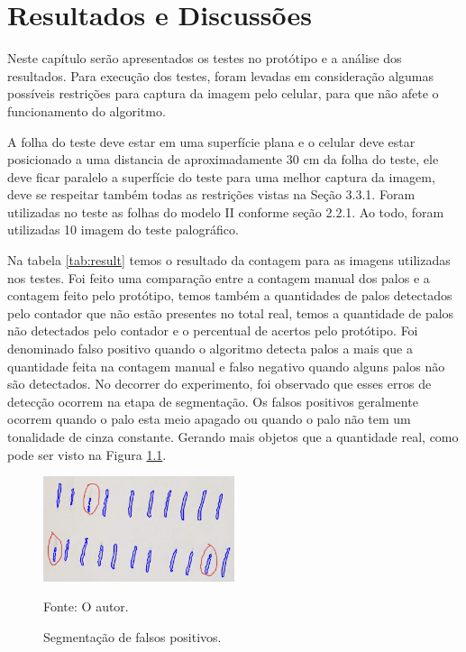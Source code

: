 \chapter{Resultados e Discussões}
\label{cap:resultados}

Neste capítulo serão apresentados os testes no protótipo e a análise dos resultados. Para execução dos testes, foram levadas em consideração algumas possíveis restrições para captura da imagem pelo celular, para que não afete o funcionamento do algoritmo. 

A folha do teste deve estar em uma superfície plana e o celular deve estar posicionado a uma distancia de aproximadamente 30 cm da folha do teste, ele deve ficar paralelo a superfície do teste para uma melhor captura da imagem, deve se respeitar também todas as restrições vistas na Seção 3.3.1. Foram utilizadas no teste as folhas do modelo II conforme seção 2.2.1. Ao todo, foram utilizadas 10 imagem do teste palográfico.

Na tabela \ref{tab:result}  temos o resultado da contagem para as imagens utilizadas nos testes. Foi feito uma comparação entre a contagem manual dos palos e a contagem feito pelo protótipo, temos também a quantidades de palos detectados pelo contador que não estão presentes no total real, temos a quantidade de palos não detectados pelo contador e o percentual de acertos pelo protótipo. Foi denominado falso positivo quando o algoritmo detecta palos a mais que a quantidade feita na contagem manual e falso negativo quando alguns palos não são detectados.
No decorrer do experimento, foi observado que esses erros de detecção ocorrem na etapa de segmentação. Os falsos positivos geralmente ocorrem quando o palo esta meio apagado ou quando o palo não tem um tonalidade de cinza constante. Gerando mais objetos que a quantidade real, como pode ser visto na Figura \ref{fig:palo-seg}.

\begin{figure}[H]
 \centering
 \includegraphics[width=0.50\textwidth]{./fig/resultado-analise/seg-palo}
 \caption{Segmentação de falsos positivos.}
  Fonte: O autor.
 \label{fig:palo-seg}
\end{figure}

